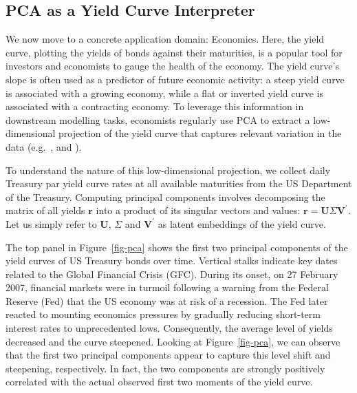 \documentclass{article}
\theoremstyle{plain}
\theoremstyle{definition}
\theoremstyle{remark}
\begin{document}
\subsection{PCA as a Yield Curve Interpreter}\label{example-principal-component-analysis}

We now move to a concrete application domain: Economics. Here, the yield curve, plotting the yields of bonds against their maturities, is a popular tool for investors and economists to gauge the health of the economy.
The yield curve's slope is often used as a predictor of future economic activity: a steep yield curve is associated with a growing economy, while a flat or inverted yield curve is associated with a contracting economy. %
To leverage this information in downstream modelling tasks, economists regularly use PCA to extract a low-dimensional projection of the yield curve that captures relevant variation in the data (e.g.\ \citet{berardi2022dissecting}, \citet{kumar2022effective} and \citet{crump2019deconstructing}).

To understand the nature of this low-dimensional projection, we collect daily Treasury par yield curve rates at all available maturities from the US Department of the Treasury. Computing principal components involves decomposing the matrix of all yields \(\mathbf{r}\) into a product of its singular vectors and values: \(\mathbf{r}=\mathbf{U}\Sigma\mathbf{V}^{\prime}\). Let us simply refer to \(\mathbf{U}\), \(\Sigma\) and \(\mathbf{V}^{\prime}\) as latent embeddings of the yield curve.

The top panel in Figure~\ref{fig-pca} shows the first two principal components of the yield curves of US Treasury bonds over time. Vertical stalks indicate key dates related to the Global Financial Crisis (GFC). During its onset, on 27 February 2007, financial markets were in turmoil following a warning from the Federal Reserve (Fed) that the US economy was at risk of a recession. The Fed later reacted to mounting economics pressures by gradually reducing short-term interest rates to unprecedented lows. Consequently, the average level of yields decreased and the curve steepened. Looking at Figure~\ref{fig-pca}, we can observe that the first two principal components appear to capture this level shift and steepening, respectively. In fact, the two components are strongly positively correlated with the actual observed first two moments of the yield curve.
\end{document}
